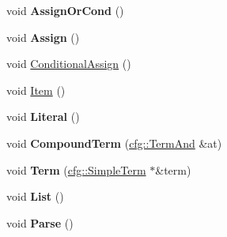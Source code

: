 \begin{DoxyCompactItemize}
\item 
\hypertarget{classhcalcfg_1_1Parser_a5fef141a6785e8f3a639186dc18ace9e}{void {\bfseries Assign\-Or\-Cond} ()}\label{classhcalcfg_1_1Parser_a5fef141a6785e8f3a639186dc18ace9e}

\item 
\hypertarget{classhcalcfg_1_1Parser_a2c4e2bd96ccff681c1d32bbe2f3859d3}{void {\bfseries Assign} ()}\label{classhcalcfg_1_1Parser_a2c4e2bd96ccff681c1d32bbe2f3859d3}

\item 
void \hyperlink{classhcalcfg_1_1Parser_aff2144d6e73f4970871d14fdec652d0f}{Conditional\-Assign} ()
\item 
void \hyperlink{classhcalcfg_1_1Parser_a02830a58b2fe792ad11954827cf46312}{Item} ()
\item 
\hypertarget{classhcalcfg_1_1Parser_a6d9e3c01a17aab5ac38e8ea2b5c961f0}{void {\bfseries Literal} ()}\label{classhcalcfg_1_1Parser_a6d9e3c01a17aab5ac38e8ea2b5c961f0}

\item 
\hypertarget{classhcalcfg_1_1Parser_ad72ade9f20c2c0bc360adf012637e070}{void {\bfseries Compound\-Term} (\hyperlink{classcfg_1_1TermAnd}{cfg\-::\-Term\-And} \&at)}\label{classhcalcfg_1_1Parser_ad72ade9f20c2c0bc360adf012637e070}

\item 
\hypertarget{classhcalcfg_1_1Parser_a4b1088b96598a1fd50e3f350bcd4da34}{void {\bfseries Term} (\hyperlink{classcfg_1_1SimpleTerm}{cfg\-::\-Simple\-Term} $\ast$\&term)}\label{classhcalcfg_1_1Parser_a4b1088b96598a1fd50e3f350bcd4da34}

\item 
\hypertarget{classhcalcfg_1_1Parser_ad73ac339e91080292d12ee20a7f60b10}{void {\bfseries List} ()}\label{classhcalcfg_1_1Parser_ad73ac339e91080292d12ee20a7f60b10}

\item 
\hypertarget{classhcalcfg_1_1Parser_ae6476241f0b7fd642add79825c0da163}{void {\bfseries Parse} ()}\label{classhcalcfg_1_1Parser_ae6476241f0b7fd642add79825c0da163}

\end{DoxyCompactItemize}
